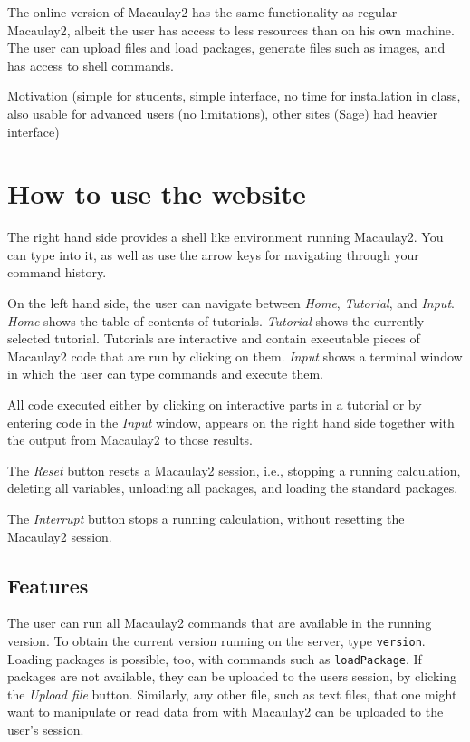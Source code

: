 \documentclass[]{article}
\begin{document}
The online version of Macaulay2 has the same functionality as regular Macaulay2, albeit the user has access to less resources than on his own machine. The user can upload files and load packages, generate files such as images, and has access to shell commands. 


Motivation (simple for students, simple interface, no time for installation in class, also usable for advanced users (no limitations), other sites (Sage) had heavier interface)


\section{How to use the website}
The right hand side provides a shell like environment running Macaulay2. You can type into it, as well as use the arrow keys for navigating through your command history.

On the left hand side, the user can navigate between {\it Home}, {\it Tutorial}, and {\it Input}. {\it Home} shows the table of contents of tutorials. {\it Tutorial} shows the currently selected tutorial. Tutorials are interactive and contain executable pieces of Macaulay2 code that are run by clicking on them. {\it Input} shows a terminal window in which the user can type commands and execute them.  

All code executed either by clicking on interactive parts in a tutorial or by entering code in the {\it Input} window, appears on the right hand side together with the output from Macaulay2 to those results. 

The {\it Reset} button resets a Macaulay2 session, i.e., stopping a running calculation, deleting all variables, unloading all packages, and loading the standard packages. 

The {\it Interrupt} button stops a running calculation, without resetting the Macaulay2 session. 

\subsection{Features}
The user can run all Macaulay2 commands that are available in the running version. To obtain the current version running on the server, type {\tt version}. Loading packages is possible, too, with commands such as {\tt loadPackage}. If packages are not available, they can be uploaded to the users session, by clicking the {\it Upload file} button. Similarly, any other file, such as text files, that one might want to manipulate or read data from with Macaulay2 can be uploaded to the user's session. 
\end{document}
